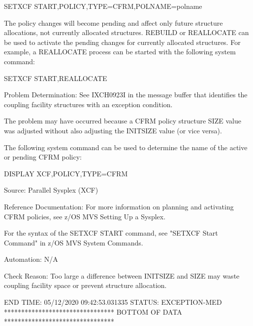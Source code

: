       SETXCF START,POLICY,TYPE=CFRM,POLNAME=polname                            

    The policy changes will become pending and affect only future              
    structure allocations, not currently allocated structures. REBUILD          
    or REALLOCATE can be used to activate the pending changes for              
    currently allocated structures. For example, a REALLOCATE process          
    can be started with the following system command:                          

       SETXCF START,REALLOCATE                                                 

   Problem Determination:  See IXCH0923I in the message buffer that             
    identifies the coupling facility structures with an exception              
    condition.                                                                 

    The problem may have occurred because a CFRM policy structure SIZE         
    value was adjusted without also adjusting the INITSIZE value (or           
    vice versa).                                                                

    The following system command can be used to determine the name of          
    the active or pending CFRM policy:                                         

       DISPLAY XCF,POLICY,TYPE=CFRM                                            

  Source:  Parallel Sysplex (XCF)                                              

  Reference Documentation:  For more information on planning and               
    activating CFRM policies, see z/OS MVS Setting Up a Sysplex.               

    For the syntax of the SETXCF START command, see "SETXCF Start              
    Command" in z/OS MVS System Commands.                                      

  Automation:  N/A                                                             

  Check Reason:  Too large a difference between INITSIZE and SIZE may          
    waste coupling facility space or prevent structure allocation.             

END TIME: 05/12/2020 09:42:53.031335  STATUS: EXCEPTION-MED                     
******************************** BOTTOM OF DATA ********************************